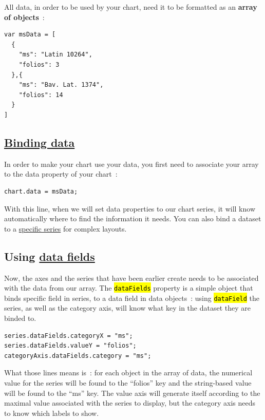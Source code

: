 \documentclass[a4paper,12pt,twoside]{book}
\let\OldTexttt\texttt
\renewcommand{\texttt}[1]{\OldTexttt{\hl{#1}}}
\begin{document}
All data, in order to be used by your chart, need it to be formatted as an \textbf{array of objects}~:

\begin{lstlisting}
var msData = [
  {
    "ms": "Latin 10264",
    "folios": 3
  },{
    "ms": "Bav. Lat. 1374",
    "folios": 14
  }
]
\end{lstlisting}

			\subsection{\href{https://www.amcharts.com/docs/v4/concepts/series/\#Binding_to_data}{Binding data}}\label{binding-data}

In order to make your chart use your data, you first need to associate your array to the data property of your chart~:

\begin{lstlisting}
chart.data = msData;
\end{lstlisting}

With this line, when we will set data properties to our chart series, it will know automatically where to find the information it needs. You can also bind a dataset to a \href{https://www.amcharts.com/docs/v4/concepts/data/\#Series_specific_data}{specific series} for complex layouts.

			\subsection{Using \href{https://www.amcharts.com/docs/v4/concepts/data/\#Data_fields}{data fields}}\label{using-datafields}

Now, the axes and the series that have been earlier create needs to be associated with the data from our array. The \texttt{dataFields} property is a simple object that binds specific field in series, to a data field in data objects~: using \texttt{dataField} the series, as well as the category axis, will know what key in the dataset they are binded to.

\begin{lstlisting}
series.dataFields.categoryX = "ms";
series.dataFields.valueY = "folios";
categoryAxis.dataFields.category = "ms";
\end{lstlisting}

What those lines means is~: for each object in the array of data, the numerical value for the series will be found to the ``folios'' key and the string-based value will be found to the ``ms'' key. The value axis will generate itself according to the maximal value associated with the series to display, but the category axis needs to know which labels to show.
\end{document}
